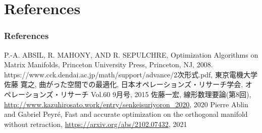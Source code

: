 \documentclass[dvipdfmx,11pt]{beamer}		%
\begin{document}
\section*{References}
    \begin{frame}\frametitle{References}
        \begin{thebibliography}{9}
            \beamertemplatetextbibitems
             P.-A. ABSIL, R. MAHONY, AND R. SEPULCHRE, Optimization Algorithms on Matrix Manifolds, 
                       Princeton University Press, Princeton, NJ, 2008.
             https://www.cck.dendai.ac.jp/math/support/advance/2次形式.pdf, 東京電機大学
             佐藤 寛之, 曲がった空間での最適化, 日本オペレーションズ・リサーチ学会, オペレーションズ・リサーチ Vol.60 9月号, 2015
             佐藤一宏, 線形数理要論(第8回), \url{http://www.kazuhirosato.work/entry/senkeisuriyoron_2020}, 2020
             Pierre Ablin and Gabriel Peyré, Fast and accurate optimization on the orthogonal manifold without retraction, \url{https://arxiv.org/abs/2102.07432}, 2021
	    \end{thebibliography}
    \end{frame}
\end{document}
